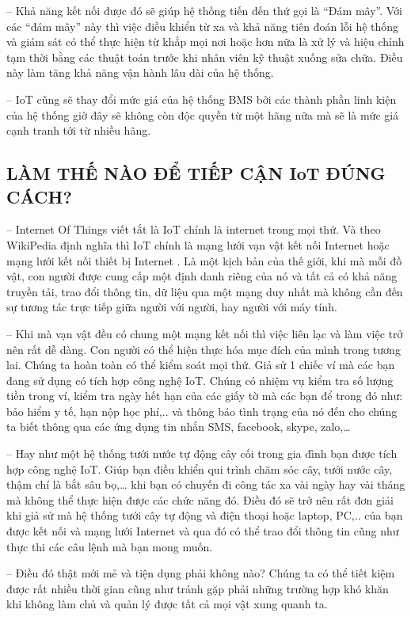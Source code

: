 	-- Khả năng kết nối được đó sẽ giúp hệ thống tiến đến thứ gọi là ``Đám mây''. Với các ``đám mây'' này thì việc điều khiển từ xa và khả năng tiên đoán lỗi hệ thống và giám sát có thể thực hiện từ khắp mọi nơi hoặc hơn nữa là xử lý và hiệu chỉnh tạm thời bằng các thuật toán trước khi nhân viên kỹ thuật xuống sửa chữa. Điều này làm tăng khả năng vận hành lâu dài của hệ thống.
	
	-- IoT cũng sẽ thay đổi mức giá của hệ thống BMS bởi các thành phần linh kiện của hệ thống giờ đây sẽ không còn độc quyền từ một hãng nữa mà sẽ là mức giá cạnh tranh tới từ nhiều hãng.
	\subsection{LÀM THẾ NÀO ĐỂ TIẾP CẬN IoT ĐÚNG CÁCH?}
	-- Internet Of Things viết tắt là IoT chính là internet trong mọi thứ. Và theo WikiPedia định nghĩa thì IoT chính là mạng lưới vạn vật kết nối Internet hoặc mạng lưới kết nối thiết bị Internet . Là một kịch bản của thế giới, khi mà mỗi đồ vật, con người được cung cấp một định danh riêng của nó và tất cả có khả năng truyền tải, trao đổi thông tin, dữ liệu qua một mạng duy nhất mà không cần đến sự tương tác trực tiếp giữa người với người, hay người với máy tính.
	
	-- Khi mà vạn vật đều có chung một mạng kết nối thì việc liên lạc và làm việc trở nên rất dễ dàng. Con người có thể hiện thực hóa mục đích của mình trong tương lai. Chúng ta hoàn toàn có thể kiểm soát mọi thứ. Giả sử 1 chiếc ví mà các bạn đang sử dụng có tích hợp công nghệ IoT. Chúng có nhiệm vụ kiểm tra số lượng tiền trong ví, kiểm tra ngày hết hạn của các giấy tờ mà các bạn để trong đó như: bảo hiểm y tế, hạn nộp học phí,.. và thông báo tình trạng của nó đến cho chúng ta biết thông qua các ứng dụng tin nhắn SMS, facebook, skype, zalo,…
	
	-- Hay như một hệ thống tưới nước tự động cây cối trong gia đình bạn được tích hợp công nghệ IoT. Giúp bạn điều khiển qui trình chăm sóc cây, tưới nước cây, thậm chí là bắt sâu bọ,… khi bạn có chuyến đi công tác xa vài ngày hay vài tháng mà không thể thực hiện được các chức năng đó. Điều đó sẽ trở nên rất đơn giải khi giả sử mà hệ thống tưới cây tự động và điện thoại hoặc laptop, PC,.. của bạn được kết nối và mạng lưới Internet và qua đó có thể trao đổi thông tin cũng như thực thi các câu lệnh mà bạn mong muốn.
	
	-- Điều đó thật mới mẻ và tiện dụng phải không nào? Chúng ta có thể tiết kiệm được rất nhiều thời gian cũng như tránh gặp phải những trường hợp khó khăn khi không làm chủ và quản lý được tất cả mọi vật xung quanh ta.

